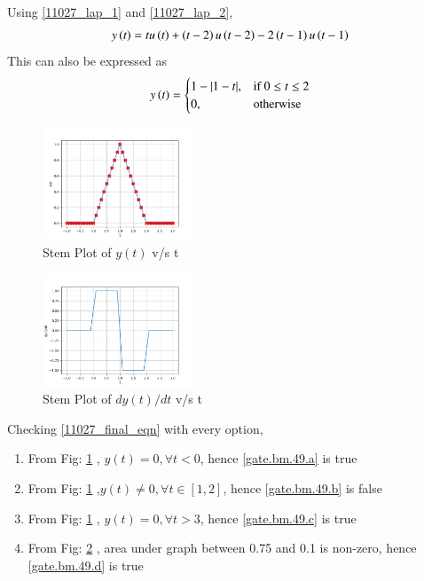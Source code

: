 \documentclass[journal,12pt,twocolumn]{IEEEtran}
\theoremstyle{remark}
\begin{document}
Using \eqref{11027_lap_1} and \eqref{11027_lap_2}, 
\begin{align}
    y\left(t\right) = tu\left(t\right) + \left(t-2\right)u\left(t-2\right) -2\left(t-1\right)u\left(t-1\right) \label{11027_final_eqn_temp}
\end{align}
This can also be expressed as 
\begin{align}
y\left(t\right)=
    \begin{cases}
        1-|1-t|, & \text{if } 0\leq t \leq 2\\
        0, & \text{otherwise}
    \end{cases} \label{11027_final_eqn}
\end{align}

\begin{figure}[h]
    \includegraphics[width=0.4\textwidth]{figs/y(t)_vs_t.png}
    \caption{Stem Plot of $y(t)$ v/s t}\label{11027_y(t)_plot}
\end{figure}
\begin{figure}[h]
    \includegraphics[width=0.4\textwidth]{figs/dy_dt_vs_t.png}
    \caption{Stem Plot of $dy(t)/dt$ v/s t}\label{11027_dy_dt_plot}
\end{figure}
Checking \eqref{11027_final_eqn} with every option,\\
\begin{enumerate}[label = (\Alph*)]
	\item From Fig: \ref{11027_y(t)_plot} , $y(t) = 0, \forall t<0$, hence \ref{gate.bm.49.a} is true \\
	\item From Fig: \ref{11027_y(t)_plot} ,$y(t) \neq 0,\forall t \in [1,2]$, hence \ref{gate.bm.49.b} is false \\
	\item From Fig: \ref{11027_y(t)_plot} , $y(t) =0, \forall t>3$, hence \ref{gate.bm.49.c} is true \\
	\item From Fig: \ref{11027_dy_dt_plot} , area under graph between 0.75 and 0.1 is non-zero, hence \ref{gate.bm.49.d} is true \\
\end{enumerate}
\end{document}
